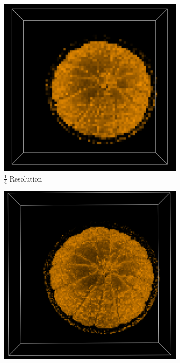 \documentclass[a4paper,twoside,11pt]{article}
\begin{document}
\begin{figure}[h!]
\begin{center}
        \begin{subfigure}[b]{0.3\textwidth}
                \includegraphics[width=\textwidth]{Images/res4.png}
                \caption{$\frac{1}{4}$ Resolution}
                \label{fig:res4}
        \end{subfigure}
        \begin{subfigure}[b]{0.3\textwidth}
                \includegraphics[width=\textwidth]{Images/res2.png}

\end{subfigure}
\end{center}
\end{figure}
\end{document}
